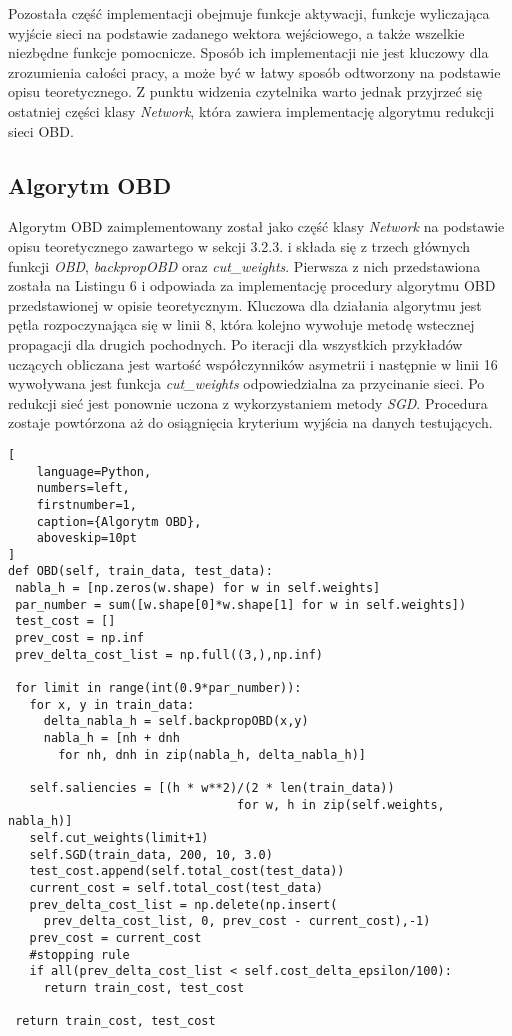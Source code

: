 \par Pozostała część implementacji obejmuje funkcje aktywacji, funkcje wyliczająca wyjście sieci na podstawie zadanego wektora wejściowego, a także wszelkie niezbędne funkcje pomocnicze. Sposób ich implementacji nie jest kluczowy dla zrozumienia całości pracy, a może być w łatwy sposób odtworzony na podstawie opisu teoretycznego. Z punktu widzenia czytelnika warto jednak przyjrzeć się ostatniej części klasy \emph{Network}, która zawiera implementację algorytmu redukcji sieci OBD.

\subsection{Algorytm OBD}
Algorytm OBD zaimplementowany został jako część klasy \emph{Network} na podstawie opisu teoretycznego zawartego w sekcji 3.2.3. i składa się z trzech głównych funkcji \emph{OBD}, \emph{backpropOBD} oraz \emph{cut{\_}weights}. Pierwsza z nich przedstawiona została na Listingu 6 i odpowiada za implementację procedury algorytmu OBD  przedstawionej w opisie teoretycznym. Kluczowa dla działania algorytmu jest pętla rozpoczynająca się w linii 8, która kolejno wywołuje metodę wstecznej propagacji dla drugich pochodnych. Po iteracji dla wszystkich przykładów uczących obliczana jest wartość współczynników asymetrii i następnie w linii 16 wywoływana jest funkcja \emph{cut{\_}weights} odpowiedzialna za przycinanie sieci. Po redukcji sieć jest ponownie uczona z wykorzystaniem metody \emph{SGD}. Procedura zostaje powtórzona aż do osiągnięcia kryterium wyjścia na danych testujących.

\begin{addmargin}[10mm]{0mm}
\begin{lstlisting}[
    language=Python,
    numbers=left,
    firstnumber=1,
    caption={Algorytm OBD},
    aboveskip=10pt
]
def OBD(self, train_data, test_data):
 nabla_h = [np.zeros(w.shape) for w in self.weights]
 par_number = sum([w.shape[0]*w.shape[1] for w in self.weights])
 test_cost = []
 prev_cost = np.inf
 prev_delta_cost_list = np.full((3,),np.inf)

 for limit in range(int(0.9*par_number)):
   for x, y in train_data:
     delta_nabla_h = self.backpropOBD(x,y)
     nabla_h = [nh + dnh
       for nh, dnh in zip(nabla_h, delta_nabla_h)]

   self.saliencies = [(h * w**2)/(2 * len(train_data))
                                for w, h in zip(self.weights, nabla_h)]
   self.cut_weights(limit+1)
   self.SGD(train_data, 200, 10, 3.0)        
   test_cost.append(self.total_cost(test_data))    
   current_cost = self.total_cost(test_data)            
   prev_delta_cost_list = np.delete(np.insert(
     prev_delta_cost_list, 0, prev_cost - current_cost),-1)
   prev_cost = current_cost
   #stopping rule
   if all(prev_delta_cost_list < self.cost_delta_epsilon/100):
     return train_cost, test_cost 

 return train_cost, test_cost
\end{lstlisting}
\end{addmargin}

